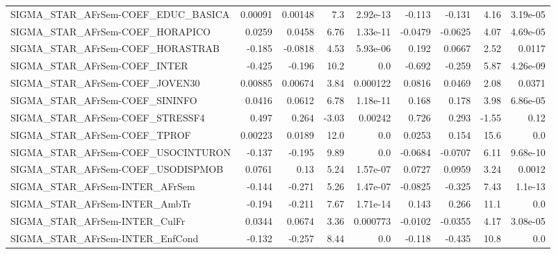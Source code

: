 \begin{tabular}{lrrrrrrrr}
SIGMA\_STAR\_AFrSem-COEF\_EDUC\_BASICA    &     0.00091 &      0.00148 &     7.3 & 2.92e-13 &     -0.113 &      -0.131 &         4.16 &      3.19e-05 \\
SIGMA\_STAR\_AFrSem-COEF\_HORAPICO       &      0.0259 &       0.0458 &    6.76 & 1.33e-11 &    -0.0479 &     -0.0625 &         4.07 &      4.69e-05 \\
SIGMA\_STAR\_AFrSem-COEF\_HORASTRAB      &      -0.185 &      -0.0818 &    4.53 & 5.93e-06 &      0.192 &      0.0667 &         2.52 &        0.0117 \\
SIGMA\_STAR\_AFrSem-COEF\_INTER          &      -0.425 &       -0.196 &    10.2 &      0.0 &     -0.692 &      -0.259 &         5.87 &      4.26e-09 \\
SIGMA\_STAR\_AFrSem-COEF\_JOVEN30        &     0.00885 &      0.00674 &    3.84 & 0.000122 &     0.0816 &      0.0469 &         2.08 &        0.0371 \\
SIGMA\_STAR\_AFrSem-COEF\_SININFO        &      0.0416 &       0.0612 &    6.78 & 1.18e-11 &      0.168 &       0.178 &         3.98 &      6.86e-05 \\
SIGMA\_STAR\_AFrSem-COEF\_STRESSF4       &       0.497 &        0.264 &   -3.03 &  0.00242 &      0.726 &       0.293 &        -1.55 &          0.12 \\
SIGMA\_STAR\_AFrSem-COEF\_TPROF          &     0.00223 &       0.0189 &    12.0 &      0.0 &     0.0253 &       0.154 &         15.6 &           0.0 \\
SIGMA\_STAR\_AFrSem-COEF\_USOCINTURON    &      -0.137 &       -0.195 &    9.89 &      0.0 &    -0.0684 &     -0.0707 &         6.11 &      9.68e-10 \\
SIGMA\_STAR\_AFrSem-COEF\_USODISPMOB     &      0.0761 &         0.13 &    5.24 & 1.57e-07 &     0.0727 &      0.0959 &         3.24 &        0.0012 \\
SIGMA\_STAR\_AFrSem-INTER\_AFrSem        &      -0.144 &       -0.271 &    5.26 & 1.47e-07 &    -0.0825 &      -0.325 &         7.43 &       1.1e-13 \\
SIGMA\_STAR\_AFrSem-INTER\_AmbTr         &      -0.194 &       -0.211 &    7.67 & 1.71e-14 &      0.143 &       0.266 &         11.1 &           0.0 \\
SIGMA\_STAR\_AFrSem-INTER\_CulFr         &      0.0344 &       0.0674 &    3.36 & 0.000773 &    -0.0102 &     -0.0355 &         4.17 &      3.08e-05 \\
SIGMA\_STAR\_AFrSem-INTER\_EnfCond       &      -0.132 &       -0.257 &    8.44 &      0.0 &     -0.118 &      -0.435 &         10.8 &           0.0 \\

\end{tabular}
